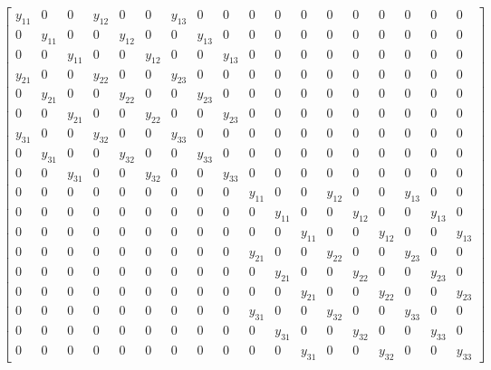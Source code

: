 \newpage
\begin{equation*}
\left[\begin{array}{cccccccccccccccccc}y_{11} & 0 & 0 & y_{12} & 0 & 0 & y_{13} & 0 & 0 & 0 & 0 & 0 & 0 & 0 & 0 & 0 & 0 & 0\\0 & y_{11} & 0 & 0 & y_{12} & 0 & 0 & y_{13} & 0 & 0 & 0 & 0 & 0 & 0 & 0 & 0 & 0 & 0\\0 & 0 & y_{11} & 0 & 0 & y_{12} & 0 & 0 & y_{13} & 0 & 0 & 0 & 0 & 0 & 0 & 0 & 0 & 0\\y_{21} & 0 & 0 & y_{22} & 0 & 0 & y_{23} & 0 & 0 & 0 & 0 & 0 & 0 & 0 & 0 & 0 & 0 & 0\\0 & y_{21} & 0 & 0 & y_{22} & 0 & 0 & y_{23} & 0 & 0 & 0 & 0 & 0 & 0 & 0 & 0 & 0 & 0\\0 & 0 & y_{21} & 0 & 0 & y_{22} & 0 & 0 & y_{23} & 0 & 0 & 0 & 0 & 0 & 0 & 0 & 0 & 0\\y_{31} & 0 & 0 & y_{32} & 0 & 0 & y_{33} & 0 & 0 & 0 & 0 & 0 & 0 & 0 & 0 & 0 & 0 & 0\\0 & y_{31} & 0 & 0 & y_{32} & 0 & 0 & y_{33} & 0 & 0 & 0 & 0 & 0 & 0 & 0 & 0 & 0 & 0\\0 & 0 & y_{31} & 0 & 0 & y_{32} & 0 & 0 & y_{33} & 0 & 0 & 0 & 0 & 0 & 0 & 0 & 0 & 0\\0 & 0 & 0 & 0 & 0 & 0 & 0 & 0 & 0 & y_{11} & 0 & 0 & y_{12} & 0 & 0 & y_{13} & 0 & 0\\0 & 0 & 0 & 0 & 0 & 0 & 0 & 0 & 0 & 0 & y_{11} & 0 & 0 & y_{12} & 0 & 0 & y_{13} & 0\\0 & 0 & 0 & 0 & 0 & 0 & 0 & 0 & 0 & 0 & 0 & y_{11} & 0 & 0 & y_{12} & 0 & 0 & y_{13}\\0 & 0 & 0 & 0 & 0 & 0 & 0 & 0 & 0 & y_{21} & 0 & 0 & y_{22} & 0 & 0 & y_{23} & 0 & 0\\0 & 0 & 0 & 0 & 0 & 0 & 0 & 0 & 0 & 0 & y_{21} & 0 & 0 & y_{22} & 0 & 0 & y_{23} & 0\\0 & 0 & 0 & 0 & 0 & 0 & 0 & 0 & 0 & 0 & 0 & y_{21} & 0 & 0 & y_{22} & 0 & 0 & y_{23}\\0 & 0 & 0 & 0 & 0 & 0 & 0 & 0 & 0 & y_{31} & 0 & 0 & y_{32} & 0 & 0 & y_{33} & 0 & 0\\0 & 0 & 0 & 0 & 0 & 0 & 0 & 0 & 0 & 0 & y_{31} & 0 & 0 & y_{32} & 0 & 0 & y_{33} & 0\\0 & 0 & 0 & 0 & 0 & 0 & 0 & 0 & 0 & 0 & 0 & y_{31} & 0 & 0 & y_{32} & 0 & 0 & y_{33}\end{array}\right]
\end{equation*}


